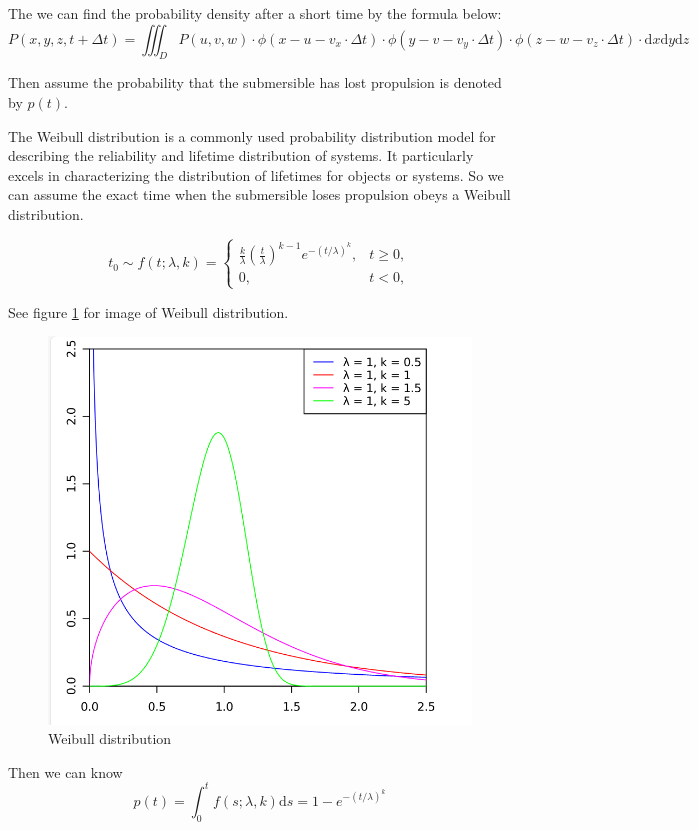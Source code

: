 \documentclass[12pt]{article}
\begin{document}
The we can find the probability density after a short time by the formula below:
$$P(x,y,z,t+\Delta t)=\iiint_{D}P(u,v,w)\cdot \phi(x-u-v_{x}\cdot \Delta t)\cdot \phi(y-v-v_{y}\cdot \Delta t)\cdot \phi(z-w-v_{z}\cdot \Delta t)\cdot \mathrm{d}x\mathrm{d}y\mathrm{d}z$$

Then assume the probability that the submersible has lost propulsion is denoted by $p(t)$.

The Weibull distribution\cite{Weibull Distribution} is a commonly used probability distribution model for describing the reliability and lifetime distribution of systems. It particularly excels in characterizing the distribution of lifetimes for objects or systems. So we can assume the exact time when the submersible loses propulsion obeys a Weibull distribution. 

$$t_{0}\sim f(t;\lambda ,k)={\begin{cases}{\frac {k}{\lambda }}\left({\frac {t}{\lambda }}\right)^{k-1}e^{-(t/\lambda )^{k}},&t\geq 0,\\0,&t<0,\end{cases}}$$

See figure \ref{fig:Weibull distribution} for image of Weibull distribution.

\begin{figure}[H]
\centering
\includegraphics[width=.9\textwidth]{weibulldistribution.png}
\caption{Weibull distribution}
\label{fig:Weibull distribution}
\end{figure}

Then we can know
$$p(t)=\int_{0}^{t}f(s;\lambda,k)\mathrm{d}s=1-e^{-(t/\lambda)^{k}}$$
\end{document}

